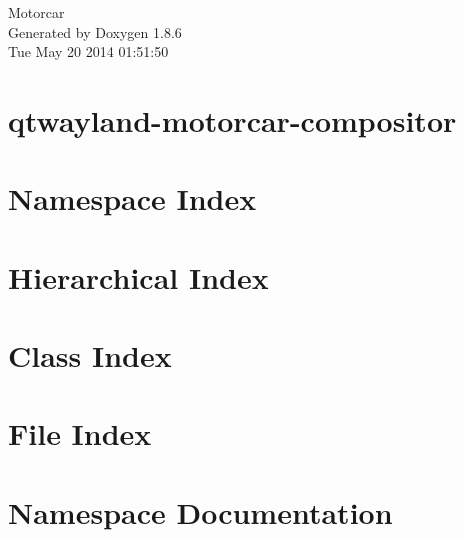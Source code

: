 \documentclass[twoside]{book}
\newcommand{\clearemptydoublepage}{%
  \newpage{\pagestyle{empty}\cleardoublepage}%
}
\begin{document}
\hypersetup{pageanchor=false}
\begin{titlepage}
\vspace*{7cm}
\begin{center}%
{\Large Motorcar }\\
\vspace*{1cm}
{\large Generated by Doxygen 1.8.6}\\
\vspace*{0.5cm}
{\small Tue May 20 2014 01:51:50}\\
\end{center}
\end{titlepage}
\clearemptydoublepage
\tableofcontents
\clearemptydoublepage
{}
\hypersetup{pageanchor=true}

\chapter{qtwayland-\/motorcar-\/compositor}
\label{md__media_dave_e89b5eb4-4b10-4edf-8ad5-0d046a46b978_dave_thesis_qtwayland-motorcar-compositor_README}
\hypertarget{md__media_dave_e89b5eb4-4b10-4edf-8ad5-0d046a46b978_dave_thesis_qtwayland-motorcar-compositor_README}{}

\chapter{Namespace Index}

\chapter{Hierarchical Index}

\chapter{Class Index}

\chapter{File Index}

\chapter{Namespace Documentation}


\end{document}
